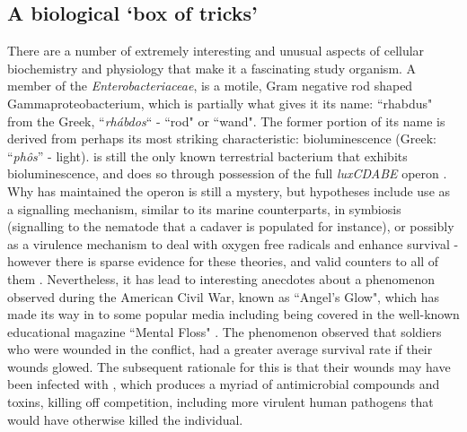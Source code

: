 \subsection{A biological `box of tricks'}
There are a number of extremely interesting and unusual aspects of \Pa{} cellular biochemistry and physiology that make it a fascinating study organism. A member of the \emph{Enterobacteriaceae}, \Pa{} is a motile, Gram negative rod shaped Gammaproteobacterium, which is partially what gives it its name: ``rhabdus" from the Greek, ``\emph{rh\'abdos}`` - ``rod" or ``wand". The former portion of its name is derived from perhaps its most striking characteristic: bioluminescence (Greek: ``\emph{ph\^os}'' - light). \Pa{} is still the only known terrestrial bacterium that exhibits bioluminescence, and does so through possession of the full \emph{luxCDABE} operon \citep{Peat2010,Clarke2008a,Farmer1989,Gerrard2003}. Why \Pa{} has maintained the operon is still a mystery, but hypotheses include use as a signalling mechanism, similar to its marine counterparts, in symbiosis (signalling to the nematode that a cadaver is populated for instance), or possibly as a virulence mechanism to deal with oxygen free radicals and enhance survival - however there is sparse evidence for these theories, and valid counters to all of them \citep{Waterfield2009}. Nevertheless, it has lead to interesting anecdotes about a phenomenon observed during the American Civil War, known as ``Angel's Glow", which has made its way in to some popular media including being covered in the well-known educational magazine ``Mental Floss" \citep{Durham2001,Soniak2012}. The phenomenon observed that soldiers who were wounded in the conflict, had a greater average survival rate if their wounds glowed. The subsequent rationale for this is that their wounds may have been infected with \Pa, which produces a myriad of antimicrobial compounds and toxins, killing off competition, including more virulent human pathogens that would have otherwise killed the individual.

